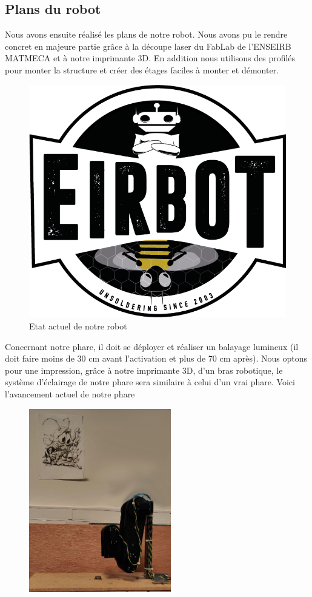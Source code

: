 \documentclass[a4paper,10pt]{article}
\begin{document}
\begin{spacing}{1.5}
\subsection{Plans du robot}
Nous avons ensuite réalisé les plans de notre robot. Nous avons pu le rendre
concret en majeure partie grâce à la découpe laser du FabLab de l'ENSEIRB MATMECA
et à notre imprimante 3D. En addition nous utilisons des profilés pour monter la
structure et créer des étages faciles à monter et démonter.
\begin{figure}[H]
  \center
  \includegraphics[scale=0.3]{LogoEirbot.png}
  \caption{Etat actuel de notre robot}
\end{figure}
Concernant notre phare, il doit se déployer et réaliser un balayage lumineux (il
doit faire moins de 30 cm avant l'activation et plus de 70 cm après). Nous optons
pour une impression, grâce à notre imprimante 3D, d'un bras robotique, le système
d'éclairage de notre phare sera similaire à celui d'un vrai phare. Voici
l'avancement actuel de notre phare
\begin{multicols}{2}
\begin{figure}[H]
  \center
  \includegraphics[scale=0.3, height=8cm]{phare_r.png}

\end{figure}
\end{multicols}
\end{spacing}
\end{document}
